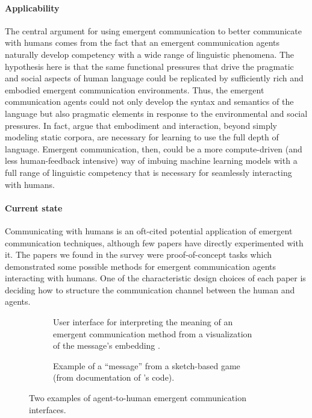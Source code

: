 \paragraph{Applicability}
The central argument for using emergent communication to better communicate with humans comes from the fact that an emergent communication agents naturally develop competency with a wide range of linguistic phenomena.
The hypothesis here is that the same functional pressures that drive the pragmatic and social aspects of human language could be replicated by sufficiently rich and embodied emergent communication environments.
Thus, the emergent communication agents could not only develop the syntax and semantics of the language but also pragmatic elements in response to the environmental and social pressures.
In fact, \citet{bisk-etal-2020-experience} argue that embodiment and interaction, beyond simply modeling static corpora, are necessary for learning to use the full depth of language.
Emergent communication, then, could be a more compute-driven (and less human-feedback intensive) way of imbuing machine learning models with a full range of linguistic competency that is necessary for seamlessly interacting with humans.


\paragraph{Current state}
Communicating with humans is an oft-cited potential application of emergent communication techniques, although few papers have directly experimented with it.
The papers we found in the survey were proof-of-concept tasks which demonstrated some possible methods for emergent communication agents interacting with humans.
One of the characteristic design choices of each paper is deciding how to structure the communication channel between the human and agents.

\begin{figure}
  \begin{subfigure}[t]{0.65\textwidth}
    \centering
    \caption{User interface for interpreting the meaning of an emergent communication method from a visualization of the message's embedding \citep{Tucker2021EmergentDC}.}
    \unskip\label{fig:embed}
  \end{subfigure}
  \hfill
  \begin{subfigure}[t]{0.30\textwidth}
    \centering
    \caption{Example of a ``message'' from a sketch-based game (from documentation of \citet{mihai2021learning}'s code).}
    \unskip\label{fig:sketch}
  \end{subfigure}
  \caption{Two examples of agent-to-human emergent communication interfaces.}
\end{figure}


